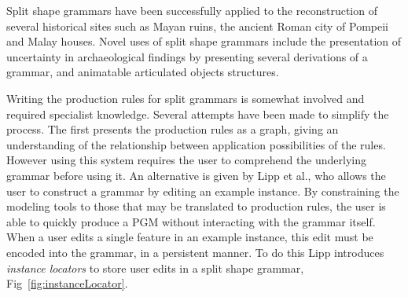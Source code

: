 
Split shape grammars have been successfully applied to the reconstruction of  several historical sites such as Mayan ruins\cite{cga_puuc}, the ancient Roman city of Pompeii\cite{Muller05,Dylla08} and Malay houses\cite{Said08}. Novel uses of split shape grammars include the presentation of uncertainty in archaeological findings by presenting several derivations of a grammar\cite{Haegler09}, and animatable articulated objects structures\cite{Ilvcik10}. 


Writing the production rules for split grammars is somewhat involved and required specialist knowledge. 
Several attempts have been made to simplify the process. The first presents the production rules as a graph\cite{Patow12}, giving an understanding of the relationship between application possibilities of the rules. However using this system requires the user to comprehend the underlying grammar before using it. An alternative is given by Lipp et al.\cite{Lipp08}, who allows the user to construct a grammar by editing an example instance. By constraining the modeling tools to those that may be translated to production rules, the user is able to quickly produce a PGM without interacting with the grammar itself. When a user edits a single feature in an example instance, this edit must be encoded into the grammar, in a persistent manner. To do this Lipp introduces \emph{instance locators} to store user edits in a split shape grammar, Fig~\ref{fig:instanceLocator}. 


